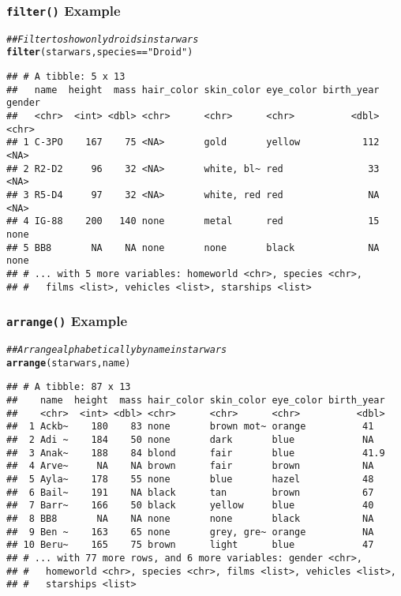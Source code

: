 \documentclass{beamer}\usepackage[]{graphicx}\usepackage[]{color}
\makeatletter
\newcommand{\hlstr}[1]{\textcolor[rgb]{0.192,0.494,0.8}{#1}}%
\newcommand{\hlcom}[1]{\textcolor[rgb]{0.678,0.584,0.686}{\textit{#1}}}%
\newcommand{\hlopt}[1]{\textcolor[rgb]{0,0,0}{#1}}%
\newcommand{\hlstd}[1]{\textcolor[rgb]{0.345,0.345,0.345}{#1}}%
\newcommand{\hlkwd}[1]{\textcolor[rgb]{0.737,0.353,0.396}{\textbf{#1}}}%
\newenvironment{kframe}{%
 \def\at@end@of@kframe{}%
 \ifinner\ifhmode%
  \def\at@end@of@kframe{\end{minipage}}%
  \begin{minipage}{\columnwidth}%
 \fi\fi%
 \def\FrameCommand##1{\hskip\@totalleftmargin \hskip-\fboxsep
 \colorbox{shadecolor}{##1}\hskip-\fboxsep
     \hskip-\linewidth \hskip-\@totalleftmargin \hskip\columnwidth}%
 \MakeFramed {\advance\hsize-\width
   \@totalleftmargin\z@ \linewidth\hsize
   \@setminipage}}%
 {\par\unskip\endMakeFramed%
 \at@end@of@kframe}
\newenvironment{knitrout}{}{} %
\makeatother
\begin{document}
\begin{frame}[fragile]\frametitle{\texttt{filter()} Example}
\begin{knitrout}\footnotesize
{}\color{fgcolor}\begin{kframe}
\begin{alltt}
\hlcom{## Filter to show only droids in starwars}
\hlkwd{filter}\hlstd{(starwars, species} \hlopt{==} \hlstr{"Droid"}\hlstd{)}
\end{alltt}
\begin{verbatim}
## # A tibble: 5 x 13
##   name  height  mass hair_color skin_color eye_color birth_year gender
##   <chr>  <int> <dbl> <chr>      <chr>      <chr>          <dbl> <chr> 
## 1 C-3PO    167    75 <NA>       gold       yellow           112 <NA>  
## 2 R2-D2     96    32 <NA>       white, bl~ red               33 <NA>  
## 3 R5-D4     97    32 <NA>       white, red red               NA <NA>  
## 4 IG-88    200   140 none       metal      red               15 none  
## 5 BB8       NA    NA none       none       black             NA none  
## # ... with 5 more variables: homeworld <chr>, species <chr>,
## #   films <list>, vehicles <list>, starships <list>
\end{verbatim}
\end{kframe}
\end{knitrout}
\end{frame}

\begin{frame}[fragile]\frametitle{\texttt{arrange()} Example}
\begin{knitrout}\footnotesize
{}\color{fgcolor}\begin{kframe}
\begin{alltt}
\hlcom{## Arrange alphabetically by name in starwars}
\hlkwd{arrange}\hlstd{(starwars, name)}
\end{alltt}
\begin{verbatim}
## # A tibble: 87 x 13
##    name  height  mass hair_color skin_color eye_color birth_year
##    <chr>  <int> <dbl> <chr>      <chr>      <chr>          <dbl>
##  1 Ackb~    180    83 none       brown mot~ orange          41  
##  2 Adi ~    184    50 none       dark       blue            NA  
##  3 Anak~    188    84 blond      fair       blue            41.9
##  4 Arve~     NA    NA brown      fair       brown           NA  
##  5 Ayla~    178    55 none       blue       hazel           48  
##  6 Bail~    191    NA black      tan        brown           67  
##  7 Barr~    166    50 black      yellow     blue            40  
##  8 BB8       NA    NA none       none       black           NA  
##  9 Ben ~    163    65 none       grey, gre~ orange          NA  
## 10 Beru~    165    75 brown      light      blue            47  
## # ... with 77 more rows, and 6 more variables: gender <chr>,
## #   homeworld <chr>, species <chr>, films <list>, vehicles <list>,
## #   starships <list>
\end{verbatim}
\end{kframe}
\end{knitrout}
\end{frame}
\end{document}
